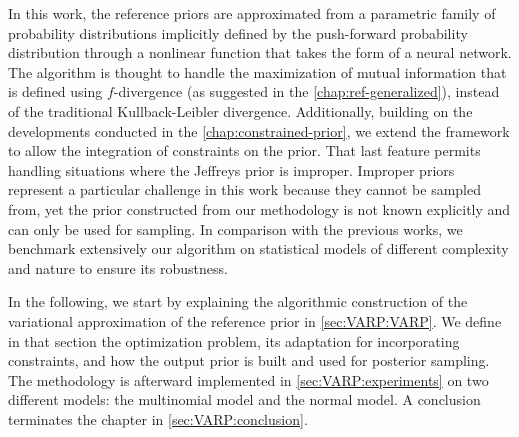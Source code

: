 In this work,
the {reference priors} are approximated from a parametric family of probability distributions implicitly defined by the push-forward probability distribution through a nonlinear function that takes the form of a neural network. %
The algorithm is thought to handle the maximization of mutual information that is defined using $f$-divergence (as suggested in the \cref{chap:ref-generalized}), instead of the traditional Kullback-Leibler divergence.
Additionally, building on the developments conducted in the \cref{chap:constrained-prior}, we extend the framework to allow the integration of constraints on the prior. That last feature permits handling situations where the Jeffreys prior is improper. Improper priors represent a particular challenge in this work because they cannot be sampled from, yet the prior constructed from our methodology is not known explicitly and can only be used for sampling. %
In comparison with the previous works, we benchmark extensively our algorithm on statistical models of different complexity and nature to ensure its robustness.


In the following, we start by explaining the algorithmic construction of the variational approximation of the reference prior in \cref{sec:VARP:VARP}. We define in that section the optimization problem, its adaptation for incorporating constraints,  and how the output prior is built and used for posterior sampling.
The methodology is afterward implemented in \cref{sec:VARP:experiments} on two different models: the multinomial model and the normal model.
A conclusion terminates the chapter in \cref{sec:VARP:conclusion}.









